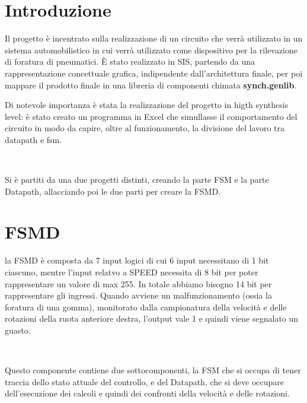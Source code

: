 \documentclass[a4paper,titlepage]{book}
\begin{document}
\begin{frontespizio}


\end{frontespizio}

\tableofcontents



\chapter{Introduzione}

Il progetto è incentrato sulla realizzazione di un circuito che verrà utilizzato in un sistema automobilistico in cui verrà utilizzato come dispositivo per la rilevazione di foratura di pneumatici. È stato realizzato in SIS, partendo da una rappresentazione concettuale grafica, indipendente dall'architettura finale, per poi mappare il prodotto finale in una libreria di componenti chimata \textbf{synch.genlib}.

Di notevole importanza è stata la realizzazione del progetto in higth synthesis level: è stato creato un programma in Excel che simullasse il comportamento del circuito in modo da capire, oltre al funzionamento, la divisione del lavoro tra datapath e fsm.

~

Si è partiti da una due progetti distinti, creando la parte FSM e la parte Datapath, allacciando poi le due parti per creare la FSMD.


\chapter{FSMD}

 la FSMD è composta da 7 input logici di cui 6 input necessitano di 1 bit ciascuno, mentre l'input relatvo a SPEED necessita di 8 bit per poter rappresentare un valore di max 255. In totale abbiamo bisogno 14 bit per rappresentare gli ingressi. Quando avviene un malfunzionamento (ossia la foratura di una gomma), monitorato dalla campionatura della velocità e delle rotazioni della ruota anteriore destra, l'output vale 1 e quindi viene segnalato un guasto.

~

Questo componente contiene due sottocomponenti, la FSM che si occupa di tener traccia dello stato attuale del controllo, e del Datapath, che si deve occupare dell'esecuzione dei calcoli e quindi dei confronti della velocità e delle rotazioni.
\end{document}
